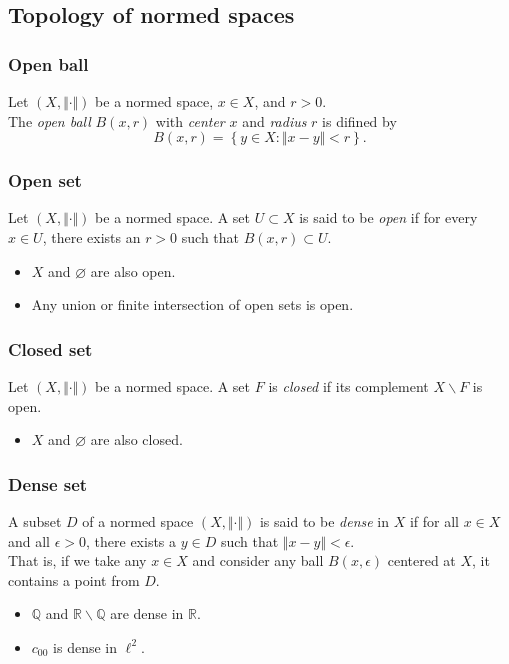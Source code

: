 \documentclass[
	border={25mm 20mm 25mm 30mm},  %
	varwidth,  %
	utf8,
]{standalone}
\begin{document}
\subsection{Topology of normed spaces}

\subsubsection{Open ball}

Let \((X,\Vert\cdot\Vert)\) be a normed space, \(x\in X\), and \(r>0\).
\\The \textit{open ball} \(B(x,r)\) with \textit{center} \(x\) and \textit{radius} \(r\) is difined by
\[B(x,r)=\left\{y\in X:\Vert x-y\Vert<r\right\}.\]

\subsubsection{Open set}

Let \((X,\Vert\cdot\Vert)\) be a normed space. A set \(U\subset X\) is said to be \textit{open} if for every \(x\in U\), there exists an \(r>0\) such that \(B(x,r)\subset U\).
\begin{itemize}
	\item \(X\) and \(\varnothing\) are also open.
	\item Any union or finite intersection of open sets is open.
\end{itemize}

\subsubsection{Closed set}

Let \((X,\Vert\cdot\Vert)\) be a normed space. A set \(F\) is \textit{closed} if its complement \(X\backslash F\) is open.
\begin{itemize}
	\item \(X\) and \(\varnothing\) are also closed.
\end{itemize}

\subsubsection{Dense set}

A subset \(D\) of a normed space \((X,\Vert\cdot\Vert)\) is said to be \textit{dense} in \(X\) if for all \(x\in X\) and all \(\epsilon>0\), there exists a \(y\in D\) such that \(\Vert x-y\Vert<\epsilon\).
\\That is, if we take any \(x\in X\) and consider any ball \(B(x,\epsilon)\) centered at \(X\), it contains a point from \(D\).
\begin{itemize}
	\item \(\mathbb{Q}\) and \(\mathbb{R}\backslash\mathbb{Q}\) are dense in \(\mathbb{R}\).
	\item \(c_{00}\) is dense in \(\ell^2\).
\end{itemize}
\end{document}
